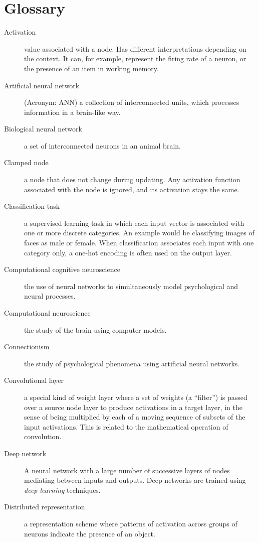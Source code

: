 \chapter*{Glossary}
\begin{description}

\item[Activation] value associated with a node. Has different interpretations depending on the context. It can, for example, represent the firing rate of a neuron, or the presence of an item in working memory.
\item[Artificial neural network] (Acronym: ANN) a collection of interconnected units, which processes information in a brain-like way.
\item[Biological neural network] a set of interconnected neurons in an animal brain.
\item[Clamped node] a node that does not change during updating. Any activation function associated with the node is ignored, and its activation stays the same.
\item[Classification task] a supervised learning task in which each input vector is associated with one or more discrete  categories. An example would be classifying images of faces as male or female. When classification associates each input with one category only, a one-hot encoding is often used on the output layer.
\item[Computational cognitive neuroscience] the use of neural networks to simultaneously model psychological and neural processes.
\item[Computational neuroscience] the study of the brain using computer models.
\item[Connectionism] the study of psychological phenomena using artificial neural networks.
\item[Convolutional layer] a special kind of weight layer where a set of weights (a ``filter'') is passed over a source node layer to produce activations in a target layer, in the sense of being multiplied by each of a moving sequence of subsets of the input activations. This is related to the mathematical operation of convolution.
\item[Deep network] A neural network with a large number of successive layers of nodes mediating between inputs and outputs. Deep networks are trained using \emph{deep learning} techniques.
\item[Distributed representation] a representation scheme where patterns of activation across groups of neurons indicate the presence of an object. 

\end{description}

